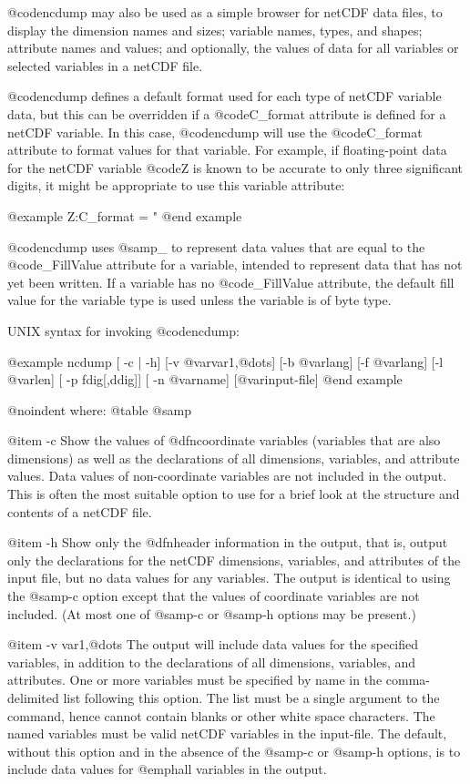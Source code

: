 {@code{ncdump} may also be used as a simple browser for netCDF data
files, to display the dimension names and sizes; variable names, types,
and shapes; attribute names and values; and optionally, the values of
data for all variables or selected variables in a netCDF file.

@code{ncdump} defines a default format used for each type of netCDF
variable data, but this can be overridden if a @code{C_format} attribute is
defined for a netCDF variable.  In this case, @code{ncdump} will use the
@code{C_format} attribute to format values for that variable.  For example,
if floating-point data for the netCDF variable @code{Z} is known to be
accurate to only three significant digits, it might be appropriate to
use this variable attribute:

@example
Z:C_format = "%
@end example

@code{ncdump} uses @samp{_} to represent data values that are equal to
the @code{_FillValue} attribute for a variable, intended to represent
data that has not yet been written.  If a variable has no
@code{_FillValue} attribute, the default fill value for the variable
type is used unless the variable is of byte type.

UNIX syntax for invoking @code{ncdump}:

@example
ncdump  [ -c | -h]  [-v @var{var1},@dots{}]  [-b @var{lang}]  [-f @var{lang}]
[-l @var{len}]  [ -p fdig[,ddig]] [ -n @var{name}]  [@var{input-file}]
@end example

@noindent
where:
@table @samp

@item -c
Show the values of @dfn{coordinate} variables (variables that are also
dimensions) as well as the declarations of all dimensions, variables, and
attribute values.  Data values of
non-coordinate variables are not included in the output.  This is often
the most suitable option to use for a brief look at the structure and
contents of a netCDF file.

@item -h
Show only the @dfn{header} information in the output, that is, output
only the declarations for the netCDF dimensions, variables, and
attributes of the input file, but no data values for any variables.  The
output is identical to using the @samp{-c} option except that the values
of coordinate variables are not included.  (At most one of @samp{-c} or
@samp{-h} options may be present.)

@item -v var1,@dots{}
The output will include data values for the specified variables, in
addition to the declarations of all dimensions, variables, and
attributes.  One or more variables must be specified by name in the
comma-delimited list following this option.  The list must be a single
argument to the command, hence cannot contain blanks or other white
space characters.  The named variables must be valid netCDF variables in
the input-file.  The default, without this option and in the absence of
the @samp{-c} or @samp{-h} options, is to include data values for @emph{all}
variables in the output.

}
